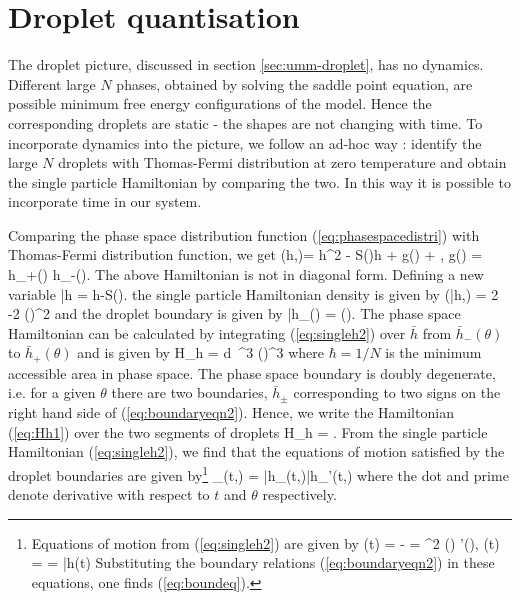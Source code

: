 \documentclass[3p,12pt]{elsarticle}
\numberwithin{equation}{section}
\begin{document}
\section{Droplet quantisation}\label{app:hi}

The droplet picture, discussed in section \ref{sec:umm-droplet}, has no dynamics.  Different large $N$ phases, obtained by solving the saddle point equation, are possible minimum free energy configurations of the model. Hence the corresponding droplets are static - the shapes are not changing with time. To incorporate dynamics into the picture, we follow an ad-hoc way : identify the large $N$ droplets with Thomas-Fermi distribution at zero temperature and obtain the single particle Hamiltonian by comparing the two. In this way it is possible to incorporate time in our system.

Comparing the phase space distribution function (\ref{eq:phasespacedistri}) with Thomas-Fermi distribution function, we get
%
\ben\label{eq:singleh}
(h,\q)= {h^2} - S(\q)h + {g(\q)} + \mu, \quad 
\where \quad g(\q) = h_+(\q) h_-(\q).
\een
%
The above Hamiltonian is not in diagonal form. Defining a new variable 
%
\ben
\bar h = h-S(\theta).
\een
%
the single particle Hamiltonian density is given by
%
\ben\label{eq:singleh2}
(\bar h,\theta) = 2 -2 \rho(\theta)^2
\een
%
and the droplet boundary is given by
%
\ben\label{eq:boundaryeqn2}
\bar h_{\pm}(\theta) = \pm \pi \rho(\theta).
\een
%
The phase space Hamiltonian can be calculated by integrating (\ref{eq:singleh2}) over $\bar h$ from $\bar h_{-}(\theta)$ to $\bar h_{+}(\theta)$ and is given by
%
\ben\label{eq:Hh1}
H_h = \int d\theta \ \pi^3 \rho(\theta)^3
\een
%
where $\hbar =1/N$ is the minimum accessible area in phase space. The phase space boundary is doubly degenerate, i.e. for a given $\theta$ there are two boundaries, $\bar h_{\pm}$ corresponding to two signs on the right hand side of (\ref{eq:boundaryeqn2}). Hence, we write the Hamiltonian (\ref{eq:Hh1}) over the two segments of droplets \cite{Maoz:2005nk}
%
\ben\label{eq:Hhtwoboundary}
H_h = .
\een
%
From the single particle Hamiltonian (\ref{eq:singleh2}), we find that the equations of motion satisfied by the droplet boundaries are given by\footnote{Equations of motion from (\ref{eq:singleh2}) are given by %
\ben\label{eq:eom}
(t) = - = \pi^2 \rho(\theta) \rho'(\theta), \qquad \dot \theta(t) =  = \bar h(t)
\een
%
Substituting the boundary relations (\ref{eq:boundaryeqn2}) in these equations, one finds (\ref{eq:boundeq}).}
%
\ben\label{eq:boundeq}
_{\pm}(t,\theta) = \bar h_\pm(t,\theta)\bar h_\pm'(t,\theta)
\een
%
where the dot and prime denote derivative with respect to $t$ and $\theta$ respectively.
\end{document}
